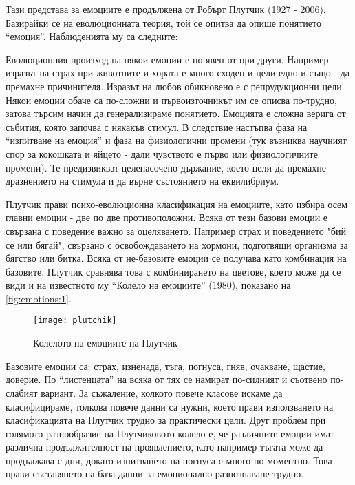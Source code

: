 \documentclass[main.tex]{subfiles}
\begin{document}
Тази представа за емоциите е продължена от Робърт Плутчик (1927 - 2006). Базирайки се на еволюционната теория, той се опитва да опише понятието ``емоция''. Наблюденията му са следните:

Еволюционния произход на някои емоции е по-явен от при други. Например изразът на страх при животните и хората е много сходен и цели едно и също - да премахне причинителя. Изразът на любов обикновено е с репрудукционни цели. Някои емоции обаче са по-сложни и първоизточникът им се описва по-трудно, затова търсим начин да генерализираме понятието. Емоцията е сложна верига от събития, която започва с някакъв стимул. В следствие настъпва фаза на ``изпитване на емоция'' и фаза на физиологични промени (тук възниква научният спор за кокошката и яйцето - дали чувството е първо или физиологичните промени). Те предизвикват целенасочено държание, което цели да премахне дразнението на стимула и да върне състоянието на еквилибриум. 

Плутчик прави психо-еволюционна класификация на емоциите, като избира осем главни емоции - две по две противоположни. Всяка от тези базови емоции е свързана с поведение важно за оцеляването. Например страх и поведението "бий се или бягай", свързано с освобождаването на хормони, подготвящи организма за бягство или битка. Всяка от не-базовите емоции се получава като комбинация на базовите. Плутчик сравнява това с комбинирането на цветове, което може да се види и на известното му ``Колело на емоциите'' (1980), показано на \autoref{fig:emotions:1}.

\begin{minipage}{0.45\textwidth}
    \begin{figure}[H]%
        \texttt{[image: plutchik]}
        \caption{Колелото на емоциите на Плутчик}
        \label{fig:emotions:1}
    \end{figure}
\end{minipage} \hfill
\begin{minipage}{0.45\textwidth}
    Базовите емоции са: страх, изненада, тъга, погнуса, гняв, очакване, щастие, доверие. По ``листенцата'' на всяка от тях се намират по-силният и съотвено по-слабият вариант. За съжаление, колкото повече класове искаме да класифицираме, толкова повече данни са нужни, което прави използването на класификацията на Плутчик трудно за практически цели. Друг проблем при голямото разнообразие на Плутчиковото колело е, че различните емоции имат различна продължителност на проявлението, като например тъгата може да продължава с дни, докато изпитването на погнуса е много по-моментно. Това прави съставянето на база данни за емоционално разпознаване трудно.
\end{minipage}
\end{document}
